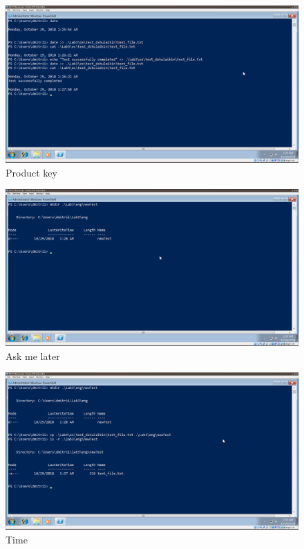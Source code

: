 \documentclass[a4paper]{article}
\begin{document}
\begin{figure}[H]
    \centering
    \includegraphics[width=\linewidth]{24.png}
    \caption{Product key}
\end{figure}


\begin{figure}[H]
    \centering
    \includegraphics[width=\linewidth]{25.png}
    \caption{Ask me later}
\end{figure}


\begin{figure}[H]
    \centering
    \includegraphics[width=\linewidth]{26.png}
    \caption{Time}
\end{figure}
\end{document}
